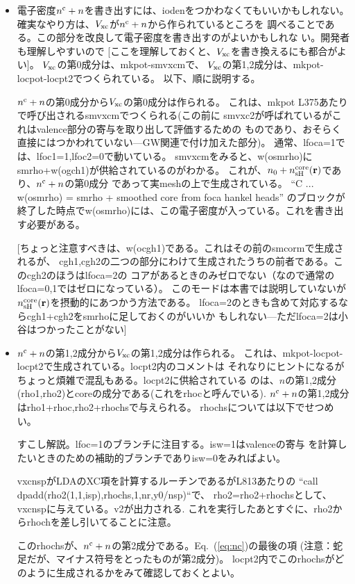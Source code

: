 \documentclass[a4paper,10pt,aip,onecolumn,amsmath,amssymb,floatfix,rmp]{revtex4-1}
\newcommand{\bfr}{{\bf r}}
\newcommand{\req}[1]{\mbox{Eq.~\!(\ref{#1})}}
\begin{document}
\begin{itemize}
\item
電子密度$n^{\rm c}+n$を書き出すには、iodenをつかわなくてもいいかもしれない。
確実なやり方は、$V_{\rm xc}$が$n^{\rm c}+n$から作られているところを
調べることである。この部分を改良して電子密度を書き出すのがよいかもしれな
い。開発者も理解しやすいので
[ここを理解しておくと、$V_{\rm xc}$を書き換えるにも都合がよい]。
$V_{\rm xc}$の第0成分は、mkpot-smvxcmで、
$V_{\rm xc}$の第1,2成分は、mkpot-locpot-locpt2でつくられている。
以下、順に説明する。

$n^{\rm c}+n$の第0成分から$V_{\rm xc}$の第0成分は作られる。
これは、mkpot L375あたりで呼び出されるsmvxcmでつくられる(この前に
smvxc2が呼ばれているがこれはvalence部分の寄与を取り出して評価するための
ものであり、おそらく直接にはつかわれていない---GW関連で付け加えた部分)。
通常、lfoca=1では、lfoc1=1,lfoc2=0で動いている。
smvxcmをみると、w(osmrho)にsmrho+w(ogch1)が供給されているのがわかる。
これが、$n_0+n^{\rm core}_{\rm sH}(\bfr)$であり、$n^{\rm c}+n$の第0成分
であって実meshの上で生成されている。
``C ... w(osmrho) = smrho + smoothed core from foca hankel heads''
のブロックが終了した時点でw(osmrho)には、この電子密度が入っている。これを書き出す必要がある。

{\small [ちょっと注意すべきは、w(ocgh1)である。これはその前のsmcormで生成されるが、
cgh1,cgh2の二つの部分にわけて生成されたうちの前者である。このcgh2のほうはlfoca=2の
コアがあるときのみゼロでない（なので通常のlfoca=0,1ではゼロになっている）。
このモードは本書では説明していないが
$n^{\rm core}_{\rm sH}(\bfr)$を摂動的にあつかう方法である。
lfoca=2のときも含めて対応するならcgh1+cgh2をsmrhoに足しておくのがいいか
もしれない---ただlfoca=2は小谷はつかったことがない]}

\item
$n^{\rm c}+n$の第1,2成分から$V_{\rm xc}$の第1,2成分は作られる。
これは、mkpot-locpot-locpt2で生成されている。locpt2内のコメントは
それなりにヒントになるがちょっと煩雑で混乱もある。locpt2に供給されている
のは、$n$の第1,2成分(rho1,rho2)とcoreの成分である(これをrhocと呼んでいる).
$n^{\rm c}+n$の第1,2成分はrho1+rhoc,rho2+rhochsで与えられる。
rhochsについては以下でせつめい。

すこし解説。lfoc=1のブランチに注目する。isw=1はvalenceの寄与
を計算したいときのための補助的ブランチでありisw=0をみればよい。

vxcnspがLDAのXC項を計算するルーチンであるがL813あたりの
``call dpadd(rho2(1,1,isp),rhochs,1,nr,y0/nsp)``で、
rho2=rho2+rhochsとして、vxcnspに与えている。v2が出力される.
これを実行したあとすぐに、rho2からrhochを差し引いてることに注意。

このrhochsが、$n^{\rm c}+n$の第2成分である。\req{eq:nc}の最後の項
(注意：蛇足だが、マイナス符号をとったものが第2成分)。
locpt2内でこのrhochsがどのように生成されるかをみて確認しておくとよい。

\end{itemize}
\end{document}
